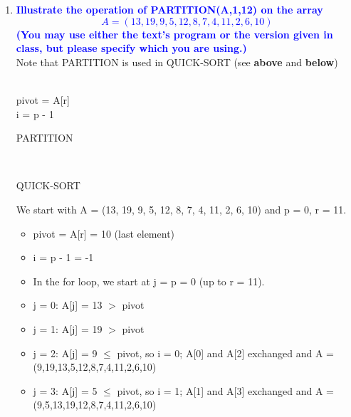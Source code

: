 \documentclass[11pt]{article}
\begin{document}
\begin{enumerate}

\item  \textbf{\textcolor{blue}{Illustrate the operation of PARTITION(A,1,12) on the array 
\[ A=(13,19,9,5,12,8,7,4,11,2,6,10) \] 
(You may use either the text's program or the version given in class, but please specify which you are using.)}}
    \\ Note that PARTITION is used in QUICK-SORT (see \textbf{above} and \textbf{below}) \\
    \begin{algorithm}[H]
        \Indm{} \\
        \Indp
            pivot = A[r] \\
            i = p - 1 \\
        \caption{PARTITION}
    \end{algorithm}
    \begin{algorithm}[H]
        \Indm{} \\
        \Indp
        \caption{QUICK-SORT}
    \end{algorithm}
    We start with A = (13, 19, 9, 5, 12, 8, 7, 4, 11, 2, 6, 10) and p = 0, r = 11.
    \begin{itemize}
        \item pivot = A[r] = 10 (last element)
        \item i = p - 1 = -1
        \item In the for loop, we start at j = p = 0 (up to r = 11).
        \item j = 0: A[j] = 13 $>$ pivot
        \item j = 1: A[j] = 19 $>$ pivot
        \item j = 2: A[j] = 9 $\leq$ pivot, so i = 0; A[0] and A[2] exchanged and A = (9,19,13,5,12,8,7,4,11,2,6,10)
        \item j = 3: A[j] = 5 $\leq$ pivot, so i = 1; A[1] and A[3] exchanged and A = (9,5,13,19,12,8,7,4,11,2,6,10)

\end{itemize}
\end{enumerate}
\end{document}
